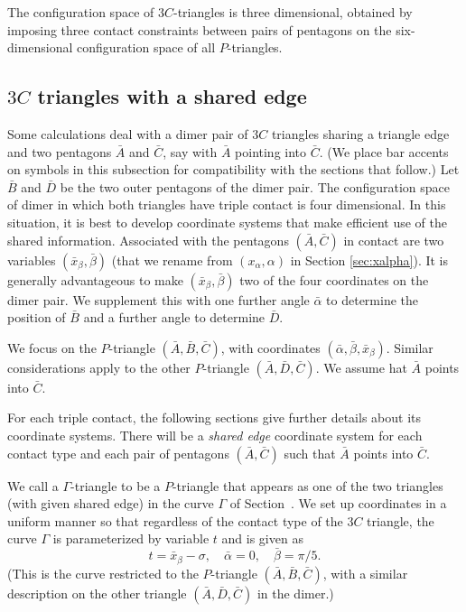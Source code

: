 The configuration space of $3C$-triangles is three dimensional,
obtained by imposing three contact constraints between pairs of
pentagons on the six-dimensional configuration space of all
$P$-triangles.

\subsection{$3C$ triangles with a shared edge}\label{sec:shared}

Some calculations deal with a dimer pair of $3C$ triangles sharing a
triangle edge and two pentagons $\bar{A}$ and $\bar{C}$, say with
$\bar{A}$ pointing into $\bar{C}$.  (We place bar accents on symbols
in this subsection for compatibility with the sections that follow.)
Let $\bar{B}$ and $\bar{D}$ be the two outer pentagons of the dimer
pair.  The configuration space of dimer in which both triangles have
triple contact is four dimensional.  In this situation, it is best to
develop coordinate systems that make efficient use of the shared
information.  Associated with the pentagons $(\bar{A},\bar{C})$ in
contact are two variables $(\bar x_\beta,\bar\beta)$ (that we rename
from $(x_\alpha,\alpha)$ in Section \ref{sec:xalpha}).  It is generally
advantageous to make $(\bar x_\beta,\bar\beta)$ two of the four
coordinates on the dimer pair.  We supplement this with one further
angle $\bar\alpha$ to determine the position of $\bar B$ and a further
angle to determine $\bar D$.

We focus on the $P$-triangle $(\bar A,\bar B,\bar C)$, with
coordinates $(\bar\alpha,\bar\beta,\bar x_\beta)$.  Similar
considerations apply to the other $P$-triangle $(\bar A,\bar D,\bar
C)$.  We assume hat $\bar A$ points into $\bar C$.

For each triple contact, the following sections give further details
about its coordinate systems.  There will be a {\it shared edge}
coordinate system for each contact type and each pair of pentagons
$(\bar A,\bar C)$ such that $\bar A$ points into $\bar C$.

We call a $\Gamma$-triangle to be a $P$-triangle that appears as one
of the two triangles (with given shared edge) in the curve $\Gamma$ of
Section~.  We set up coordinates in a uniform manner so
that regardless of the contact type of the $3C$ triangle, the curve
$\Gamma$ is parameterized by variable $t$ and is given as
\[
t = \bar x_\beta  -\sigma, \quad
\bar\alpha = 0,\quad
\bar\beta = \pi/5.
\]
(This is the curve restricted to the $P$-triangle $(\bar A,\bar B,\bar
C)$, with a similar description on the other triangle $(\bar A,\bar
D,\bar C)$ in the dimer.)

